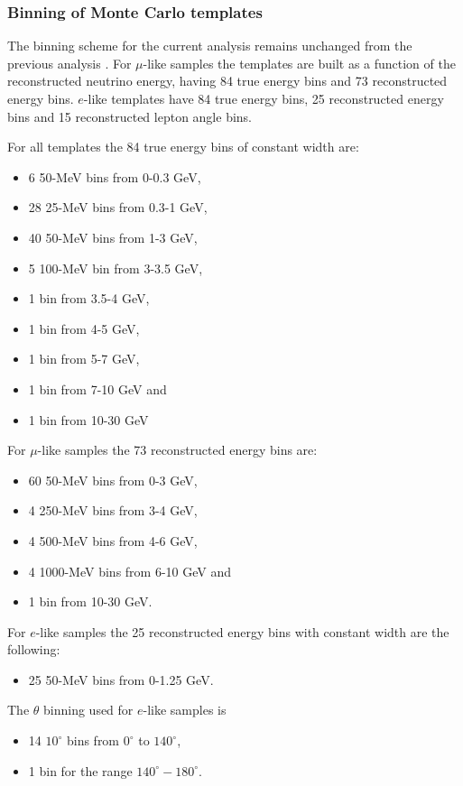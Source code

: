 \subsubsection {Binning of Monte Carlo templates}
\label{app:details:mc_templates:template_binning}

The binning scheme for the current analysis remains unchanged from the previous analysis \cite{OurRun17cCC1piJointAnalysis3Flavour}. For $\mu$-like samples the templates are built as a function of the reconstructed neutrino energy, having 84 true energy bins and 73 reconstructed energy bins. $e$-like templates have 84 true energy bins, 25 reconstructed energy bins and 15 reconstructed lepton angle bins.

For all templates the 84 true energy bins of constant width are:
\begin{itemize}
	\item 6 50-MeV bins from 0-0.3 GeV, 
	\item 28 25-MeV bins from 0.3-1 GeV,
	\item 40 50-MeV bins from 1-3 GeV,
	\item 5 100-MeV bin from 3-3.5 GeV,
	\item 1 bin from 3.5-4 GeV,
	\item 1 bin from 4-5 GeV,
	\item 1 bin from 5-7 GeV,
	\item 1 bin from 7-10 GeV and 
	\item 1 bin from 10-30 GeV
\end{itemize}

For $\mu$-like samples the 73 reconstructed energy bins are:
\begin{itemize}
	\item 60 50-MeV bins from 0-3 GeV, 
	\item 4 250-MeV bins from 3-4 GeV, 
	\item 4 500-MeV bins from 4-6 GeV, 
	\item 4 1000-MeV bins from 6-10 GeV and
	\item 1 bin from 10-30 GeV.
\end{itemize}

For $e$-like samples the 25 reconstructed energy bins with constant width are the following:
\begin{itemize}
	\item 25 50-MeV bins from 0-1.25 GeV.
\end{itemize}

The $\theta$ binning used for $e$-like samples is
\begin{itemize}
	\item 14 $10^{\circ}$ bins from $0^{\circ}$ to $140^{\circ}$, 
	\item 1 bin for the range $140^{\circ} - 180^{\circ}$. 
\end{itemize}

